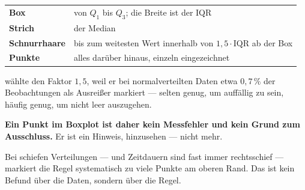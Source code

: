 \begin{merksatz}
\begin{center}
\end{center}

\begin{center}
\renewcommand{\arraystretch}{1.5}
\begin{tabular}{@{}P{2.4cm}P{6.2cm}@{}}
\toprule
\textbf{Box} & von $Q_1$ bis $Q_3$; die Breite ist der IQR\\
\textbf{Strich} & der Median\\
\textbf{Schnurrhaare} & bis zum weitesten Wert innerhalb von $1{,}5 \cdot \mathrm{IQR}$ ab der Box\\
\textbf{Punkte} & alles darüber hinaus, einzeln eingezeichnet\\
\bottomrule
\end{tabular}
\end{center}
\end{merksatz}

\begin{warnung}
 wählte den Faktor $1{,}5$, weil er bei normalverteilten Daten etwa $0{,}7\,\%$ der Beobachtungen als Ausreißer markiert --- selten genug, um auffällig zu sein, häufig genug, um nicht leer auszugehen.

\begin{center}
\begin{minipage}{0.9\textwidth}
\textbf{Ein Punkt im Boxplot ist daher kein Messfehler und kein Grund zum Ausschluss.} Er ist ein Hinweis, hinzusehen --- nicht mehr.
\end{minipage}
\end{center}

Bei schiefen Verteilungen --- und Zeitdauern sind fast immer rechtsschief --- markiert die Regel systematisch zu viele Punkte am oberen Rand. Das ist kein Befund über die Daten, sondern über die Regel.
\end{warnung}

